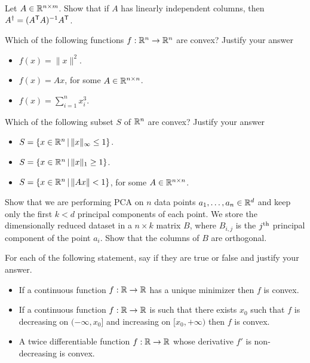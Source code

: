 \documentclass[11pt,nocut]{article}
\begin{document}

\begin{problem}
	Let $A \in \mathbb{R}^{n \times m}$. Show that if $A$ has linearly independent columns, then $A^{\dagger} = (A^{{\sf T}}A)^{-1} A^{{\sf T}}$.
\end{problem}

\begin{problem}
	Which of the following functions $f: \mathbb{R}^n \to \mathbb{R}^n$ are convex? Justify your answer
	\begin{itemize}
		\item $f(x) = \|x\|^2$.
		\item $f(x) = Ax$, for some $A \in \mathbb{R}^{n \times n}$.
		\item $f(x) = \sum_{i=1}^n x_i^3$.
	\end{itemize}
\end{problem}

\begin{problem}
	Which of the following subset $S$ of $\mathbb{R}^n$ are convex? Justify your answer
	\begin{itemize}
		\item $S = \{x \in \mathbb{R}^n \, | \, \|x\|_{\infty} \leq 1\}$.
		\item $S = \{x \in \mathbb{R}^n \, | \, \|x\|_{1} \geq 1\}$.
		\item $S = \{x \in \mathbb{R}^n \, | \, \|Ax\| < 1\}$, for some $A \in \mathbb{R}^{n \times n}$.
	\end{itemize}
\end{problem}


\begin{problem}
	Show that we are performing PCA on $n$ data points $a_1, \dots, a_n \in \mathbb{R}^d$ and keep only the first $k < d$ principal components of each point. We store the dimensionally reduced dataset in a $n \times k$ matrix $B$, where $B_{i,j}$ is the $j^{\rm th}$ principal component of the point $a_i$. Show that the columns of $B$ are orthogonal.
\end{problem}

\newpage
\begin{problem}
	For each of the following statement, say if they are true or false and justify your answer.
	\begin{itemize}
		\item If a continuous function $f:\mathbb{R} \to \mathbb{R}$ has a unique minimizer then $f$ is convex.
		\item If a continuous function $f:\mathbb{R} \to \mathbb{R}$ is such that there exists $x_0$ such that $f$ is decreasing on $(-\infty,x_0]$ and increasing on $[x_0, + \infty)$ then $f$ is convex.
		\item A twice differentiable function $f: \mathbb{R} \to \mathbb{R}$ whose derivative $f'$ is non-decreasing is convex.
	\end{itemize}
\end{problem}
\end{document}
